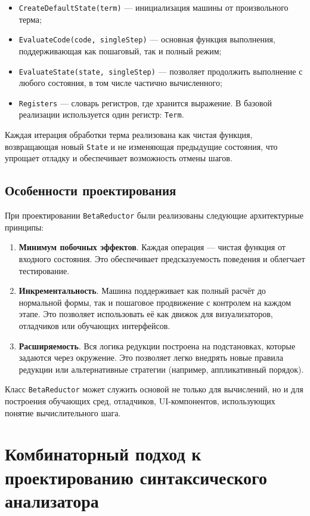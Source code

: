 \begin{itemize}
  \item \texttt{CreateDefaultState(term)} — инициализация машины от произвольного терма;
  \item \texttt{EvaluateCode(code, singleStep)} — основная функция выполнения, поддерживающая как пошаговый, так и полный режим;
  \item \texttt{EvaluateState(state, singleStep)} — позволяет продолжить выполнение с любого состояния, в том числе частично вычисленного;
  \item \texttt{Registers} — словарь регистров, где хранится выражение. В базовой реализации используется один регистр: \texttt{Term}.
\end{itemize}

Каждая итерация обработки терма реализована как чистая функция, возвращающая новый \texttt{State} и не изменяющая предыдущие состояния, что упрощает отладку и обеспечивает возможность отмены шагов.

\subsection{Особенности проектирования}

При проектировании \texttt{BetaReductor} были реализованы следующие архитектурные принципы:

\begin{enumerate}
  \item \textbf{Минимум побочных эффектов}. Каждая операция — чистая функция от входного состояния. Это обеспечивает предсказуемость поведения и облегчает тестирование.
  \item \textbf{Инкрементальность}. Машина поддерживает как полный расчёт до нормальной формы, так и пошаговое продвижение с контролем на каждом этапе. Это позволяет использовать её как движок для визуализаторов, отладчиков или обучающих интерфейсов.
  \item \textbf{Расширяемость}. Вся логика редукции построена на подстановках, которые задаются через окружение. Это позволяет легко внедрять новые правила редукции или альтернативные стратегии (например, аппликативный порядок).
\end{enumerate}


Класс \texttt{BetaReductor} может служить основой не только для вычислений, но и для построения обучающих сред, отладчиков, UI-компонентов, использующих понятие вычислительного шага.

\section{Комбинаторный подход к проектированию синтаксического анализатора}
\label{sec:parser-api}

